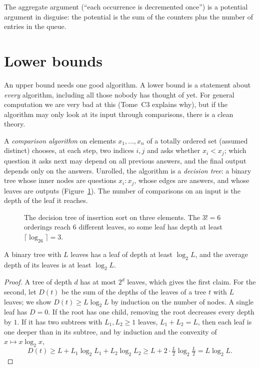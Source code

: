 The aggregate argument (``each occurrence is decremented once'') is a potential argument in disguise: the potential is the sum of the
counters plus the number of entries in the queue.

\section{Lower bounds}\label{sec:lower}

An upper bound needs one good algorithm. A lower bound is a statement about \emph{every} algorithm, including all those nobody has
thought of yet. For general computation we are very bad at this (Tome~C3 explains why), but if the algorithm may only look at its input
through comparisons, there is a clean theory.

A \emph{comparison algorithm} on elements $x_1,\dots,x_n$ of a totally ordered set (assumed distinct) chooses, at each step, two indices $i,j$
and asks whether $x_i<x_j$; which question it asks next may depend on all previous answers, and the final output depends only on the
answers. Unrolled, the algorithm is a \emph{decision tree}: a binary tree whose inner nodes are questions $x_i:x_j$, whose edges are answers,
and whose leaves are outputs (Figure~\ref{fig:dtree}). The number of comparisons on an input is the depth of the leaf it reaches.

\begin{figure}[ht]
\centering
{}
\caption{The decision tree of insertion sort on three elements. The $3!=6$ orderings reach $6$ different leaves, so some leaf has depth
at least $\lceil\log_26\rceil=3$.}
\label{fig:dtree}
\end{figure}

\begin{lemma}\label{lem:leafdepth}
A binary tree with $L$ leaves has a leaf of depth at least $\log_2L$, and the average depth of its leaves is at least $\log_2L$.
\end{lemma}
\begin{proof}
A tree of depth $d$ has at most $2^d$ leaves, which gives the first claim. For the second, let $D(t)$ be the sum of the depths of the leaves of a
tree $t$ with $L$ leaves; we show $D(t)\ge L\log_2L$ by induction on the number of nodes. A single leaf has $D=0$. If the root has one
child, removing the root decreases every depth by $1$. If it has two subtrees with $L_1,L_2\ge1$ leaves, $L_1+L_2=L$, then each leaf is one
deeper than in its subtree, and by induction and the convexity of $x\mapsto x\log_2x$,
\[
D(t)\ge L+L_1\log_2L_1+L_2\log_2L_2\ge L+2\cdot\tfrac L2\log_2\tfrac L2=L\log_2L.
\]
\end{proof}

